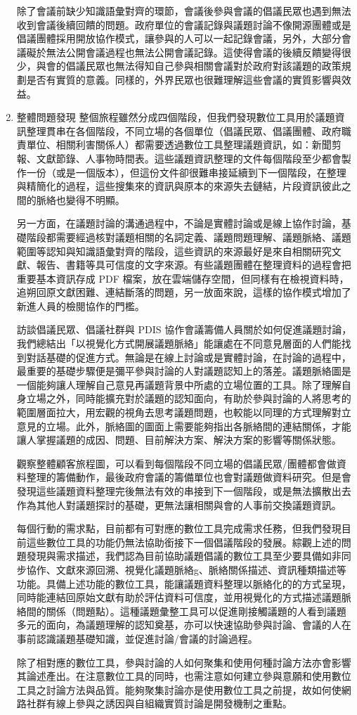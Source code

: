 \documentclass[12pt,a4paper]{article}
\begin{document}
\begin{enumerate}
除了會議前缺少知識語彙對齊的環節，會議後參與會議的倡議民眾也遇到無法收到會議後續回饋的問題。政府單位的會議記錄與議題討論不像開源團體或是倡議團體採用開放協作模式，讓參與的人可以一起記錄會議，另外，大部分會議礙於無法公開會議過程也無法公開會議記錄。這使得會議的後續反饋變得很少，與會的倡議民眾也無法得知自己參與相關會議對於政府對該議題的政策規劃是否有實質的意義。同樣的，外界民眾也很難理解這些會議的實質影響與效益。
\item 整體問題發現
\label{sec:org026a639}
整個旅程雖然分成四個階段，但我們發現數位工具用於議題資訊整理貫串在各個階段，不同立場的各個單位（倡議民眾、倡議團體、政府職責單位、相關利害關係人）都需要透過數位工具整理議題資訊，如：新聞剪報、文獻節錄、人事物時間表。這些議題資訊整理的文件每個階段至少都會製作一份（或是一個版本），但這份文件卻很難串接延續到下一個階段，在整理與精簡化的過程，這些搜集來的資訊與原本的來源失去鏈結，片段資訊彼此之間的脈絡也變得不明顯。

另一方面，在議題討論的溝通過程中，不論是實體討論或是線上協作討論，基礎階段都需要經過核對議題相關的名詞定義、議題問題理解、議題脈絡、議題範圍等認知與知識語彙對齊的階段，這些資訊的來源最好是來自相關研究文獻、報告、書籍等具可信度的文字來源。有些議題團體在整理資料的過程會把重要基本資訊存成 PDF 檔案，放在雲端儲存空間，但同樣有在檢視資料時，追朔回原文獻困難、連結斷落的問題，另一放面來說，這樣的協作模式增加了新進人員的檢閱協作的門檻。

訪談倡議民眾、倡議社群與 PDIS 協作會議籌備人員關於如何促進議題討論，我們總結出「以視覺化方式開展議題脈絡」能讓處在不同意見層面的人們能找到對話基礎的促進方式。無論是在線上討論或是實體討論，在討論的過程中，最重要的基礎步驟便是彌平參與討論的人對議題認知上的落差。議題脈絡圖是一個能夠讓人理解自己意見再議題背景中所處的立場位置的工具。除了理解自身立場之外，同時能擴充對於議題的認知面向，有助於參與討論的人將思考的範圍層面拉大，用宏觀的視角去思考議題問題，也較能以同理的方式理解對立意見的立場。此外，脈絡圖的圖面上需要能夠指出各脈絡間的連結關係，才能讓人掌握議題的成因、問題、目前解決方案、解決方案的影響等關係狀態。

觀察整體顧客旅程圖，可以看到每個階段不同立場的倡議民眾/團體都會做資料整理的籌備動作，最後政府會議的籌備單位也會對議題做資料研究。但是會發現這些議題資料整理完後無法有效的串接到下一個階段，或是無法擴散出去作為其他人對議題探討的基礎，更無法讓相關與會的人事前交換議題資訊。

每個行動的需求點，目前都有可對應的數位工具完成需求任務，但我們發現目前這些數位工具的功能仍無法協助銜接下一個倡議階段的發展。綜觀上述的問題發現與需求描述，我們認為目前協助議題倡議的數位工具至少要具備如非同步協作、文獻來源回溯、視覺化議題脈絡g、脈絡關係描述、資訊種類描述等功能。具備上述功能的數位工具，能讓議題資料整理以脈絡化的的方式呈現，同時能連結回原始文獻有助於評估資料可信度，並用視覺化的方式描述議題脈絡間的關係（問題點）。這種議題彙整工具可以促進剛接觸議題的人看到議題多元的面向，為議題理解的認知奠基，亦可以快速協助參與討論、會議的人在事前認識議題基礎知識，並促進討論/會議的討論過程。

除了相對應的數位工具，參與討論的人如何聚集和使用何種討論方法亦會影響其論述產出。在注意數位工具的同時，也需注意如何建立參與意願和使用數位工具之討論方法與品質。能夠聚集討論亦是使用數位工具之前提，故如何使網路社群有線上參與之誘因與自組織實質討論是開發機制之重點。
\end{enumerate}
\end{document}
